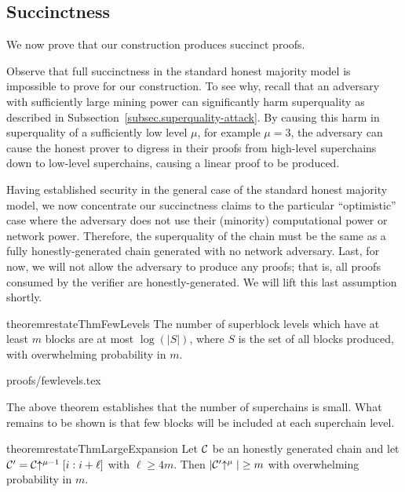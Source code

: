\subsection{Succinctness}
\label{sec.succinctness}

We now prove that our construction produces succinct proofs.

Observe that full succinctness in the standard honest majority model is
impossible to prove for our construction. To see why, recall that an adversary
with sufficiently large mining power can significantly harm superquality as
described in Subsection~\ref{subsec.superquality-attack}. By causing this harm
in superquality of a sufficiently low level $\mu$, for example $\mu = 3$, the
adversary can cause the honest prover to digress in their proofs from high-level
superchains down to low-level superchains, causing a linear proof to be
produced.

Having established security in the general case of the standard honest majority
model, we now concentrate our succinctness claims to the particular
``optimistic'' case where the adversary does not use their (minority)
computational power or network power. Therefore, the superquality of the chain
must be the same as a fully honestly-generated chain generated with no network
adversary. Last, for now, we will not allow the adversary to produce any proofs;
that is, all proofs consumed by the verifier are honestly-generated. We will
lift this last assumption shortly.

\begin{restatable}{theorem}{restateThmFewLevels}
    \label{thm.few-levels}
    The number of superblock levels which have at least $m$ blocks are at most
    $\log(|S|)$, where $S$ is the set of all blocks produced, with overwhelming
    probability in $m$.
\end{restatable}

\ifonecolumn
{proofs/fewlevels.tex}
\fi

The above theorem establishes that the number of superchains is small. What
remains to be shown is that few blocks will be included at each superchain
level.

\begin{restatable}{theorem}{restateThmLargeExpansion}
    \label{thm.large-expansion}
    Let $\mathcal{C}$ be an honestly generated chain and let
    $\mathcal{C}' = \mathcal{C}\negthickspace\uparrow^{\mu - 1}[i:i + \ell]$ with $\ell \geq 4m$.
    Then $|\mathcal{C}'\negthickspace\uparrow^\mu| \geq m$
    with overwhelming probability in $m$.
\end{restatable}

